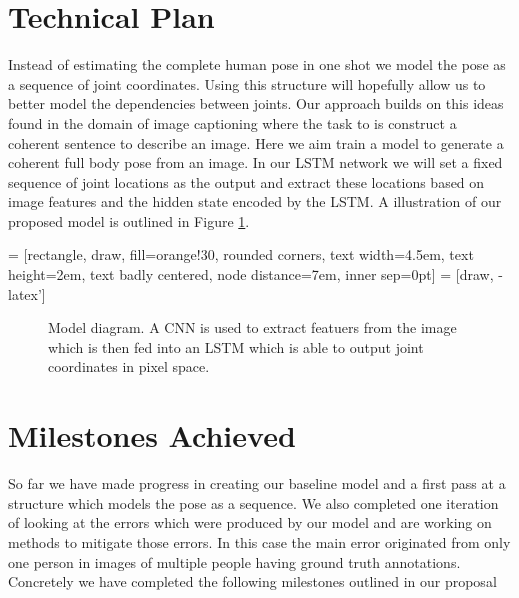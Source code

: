 \documentclass[12pt]{article}
\begin{document}
\section{Technical Plan}

Instead of estimating the complete human pose in one shot we model the pose as a sequence of joint coordinates. Using this structure will hopefully allow us to better model the dependencies between joints. Our approach builds on this ideas found in the domain of image captioning where the task to is construct a coherent sentence to describe an image. Here we aim train a model to generate a coherent full body pose from an image. In our LSTM network we will set a fixed sequence of joint locations as the output and extract these locations based on image features and the hidden state encoded by the LSTM. A illustration of our proposed model is outlined in Figure \ref{model_diag}.

 = [rectangle, draw, fill=orange!30, rounded corners, text width=4.5em, text height=2em, text badly centered, node distance=7em, inner sep=0pt]
 = [draw, -latex']


\begin{figure}
\label{model_diag}
\caption{Model diagram. A CNN is used to extract featuers from the image which is then fed into an LSTM which is able to output joint coordinates in pixel space.}
\end{figure}

\section{Milestones Achieved}

So far we have made progress in creating our baseline model and a first pass at a structure which models the pose as a sequence. We also completed one iteration of looking at the errors which were produced by our model and are working on methods to mitigate those errors. In this case the main error originated from only one person in images of multiple people having ground truth annotations. Concretely we have completed the following milestones outlined in our proposal
\end{document}
